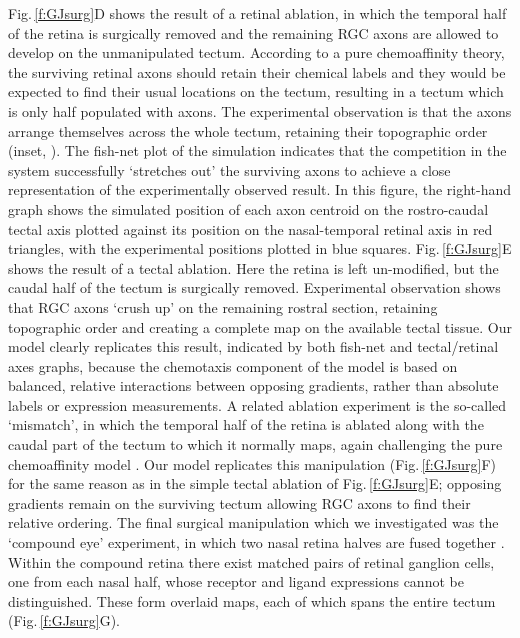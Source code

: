 \documentclass[11pt, a4paper]{article}
\begin{document}
Fig.\,\ref{f:GJsurg}D shows the result of a retinal ablation, in which the temporal half of the retina is surgically removed and the remaining RGC axons are allowed to develop on the unmanipulated tectum.
According to a pure chemoaffinity theory, the surviving retinal axons should retain their chemical labels and they would be expected to find their usual locations on the tectum, resulting in a tectum which is only half populated with axons.
The experimental observation is that the axons arrange themselves across the whole tectum, retaining their topographic order (inset, \citet{attardi_preferential_1963,schmidt_expansion_1978}).
The fish-net plot of the simulation indicates that the competition in the system successfully `stretches out' the surviving axons to achieve a close representation of the experimentally observed result.
In this figure, the right-hand graph shows the simulated position of each axon centroid on the rostro-caudal tectal axis plotted against its position on the nasal-temporal retinal axis in red triangles, with the experimental positions plotted in blue squares.
%
Fig.\,\ref{f:GJsurg}E shows the result of a tectal ablation. Here the retina is left un-modified, but the caudal half of the tectum is surgically removed. Experimental observation \citep{yoon_reorganization_1971,sharma_reformation_1972} shows that RGC axons `crush up' on the remaining rostral section, retaining topographic order and creating a complete map on the available tectal tissue. Our model clearly replicates this result, indicated by both fish-net and tectal/retinal axes graphs, because the chemotaxis component of the model is based on balanced, relative interactions between opposing gradients, rather than absolute labels or expression measurements.
%
A related ablation experiment is the so-called `mismatch', in which the temporal half of the retina is ablated along with the caudal part of the tectum to which it normally maps, again challenging the pure chemoaffinity model \citep{horder_retention_1971}. Our model replicates this manipulation (Fig.\,\ref{f:GJsurg}F) for the same reason as in the simple tectal ablation of Fig.\,\ref{f:GJsurg}E; opposing gradients remain on the surviving tectum allowing RGC axons to find their relative ordering.
%
The final surgical manipulation which we investigated was the `compound eye' experiment, in which two nasal retina halves are fused together \citep{gaze_retino-tectal_1963,fawcett_retinotectal_1982}. Within the compound retina there exist matched pairs of retinal ganglion cells, one from each nasal half, whose receptor and ligand expressions cannot be distinguished. These form overlaid maps, each of which spans the entire tectum (Fig.\,\ref{f:GJsurg}G).
\end{document}

